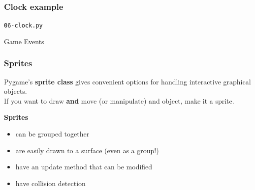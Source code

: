 \documentclass[]{beamer}   %
\begin{document}
\begin{frame}
\frametitle{Clock example}
\clockExamp
\pause
\medskip
\textcolor{tg}{\texttt{06-clock.py}}

\end{frame}













\begin{frame}[plain]
\begin{center}
\Huge
Game Events \\
\end{center}
\end{frame}



\begin{frame}
\frametitle{Sprites}

Pygame's \textbf{sprite class} gives convenient options for handling interactive graphical objects. \\
\medskip
\pause
If you want to draw \textbf{and} move (or manipulate) and object, make it a sprite.
\pause
\bigskip

\textbf{Sprites} 
\begin{itemize}
\item[] can be grouped together 
\item[] are easily drawn to a surface (even as a group!)
\item[] have an update method that can be modified
\item[] have collision detection
\end{itemize}
\end{frame}
\end{document}
